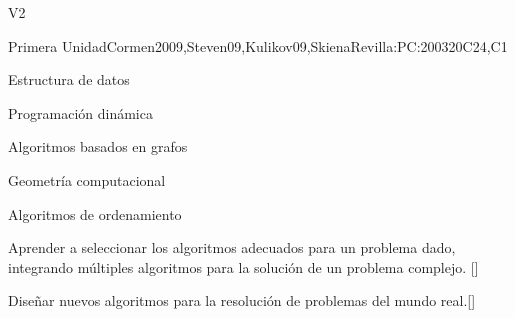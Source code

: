 \begin{syllabus}
\begin{competences}{V2}
    \item {}
    \item {}
    \item {}
\end{competences}

\begin{unit}{Primera Unidad}{}{Cormen2009,Steven09,Kulikov09,SkienaRevilla:PC:2003}{20}{C24,C1}
    \begin{topics}
        \item Estructura de datos
        \item Programación dinámica
        \item Algoritmos basados en grafos
        \item Geometría computacional
        \item Algoritmos de ordenamiento
    \end{topics}
    \begin{learningoutcomes}
        \item Aprender a seleccionar los algoritmos adecuados para un problema dado, integrando múltiples algoritmos para la solución de un problema complejo. [\Usage]
        \item Diseñar nuevos algoritmos para la resolución de problemas del mundo real.[\Usage]
    \end{learningoutcomes}
\end{unit}

\begin{coursebibliography}
\end{coursebibliography}

\end{syllabus}
